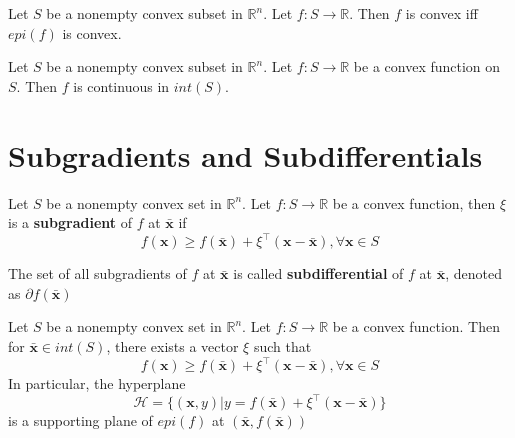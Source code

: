 			\begin{theorem}
				Let $S$ be a nonempty convex subset in $\mathbb{R}^n$. Let $f: S\rightarrow \mathbb{R}$. Then $f$ is convex iff $epi(f)$ is convex.
			\end{theorem}

			\begin{theorem}
				Let $S$ be a nonempty convex subset in $\mathbb{R}^n$. Let $f: S\rightarrow \mathbb{R}$ be a convex function on $S$. Then $f$ is continuous in $int(S)$.
			\end{theorem}

		\section{Subgradients and Subdifferentials}
			\begin{definition}[Subgradient]
				Let $S$ be a nonempty convex set in $\mathbb{R}^n$. Let $f: S\rightarrow \mathbb{R}$ be a convex function, then $\xi$ is a \textbf{subgradient} of $f$ at $\bar{\mathbf{x}}$ if
				\begin{equation}
					f(\mathbf{x}) \ge f(\bar{\mathbf{x}}) + \xi^\top(\mathbf{x} - \bar{\mathbf{x}}), \forall \mathbf{x} \in S
				\end{equation}
			\end{definition}

			\begin{definition}[Subdifferential]
				The set of all subgradients of $f$ at $\bar{\mathbf{x}}$ is called \textbf{subdifferential} of $f$ at $\bar{\mathbf{x}}$, denoted as $\partial f(\bar{\mathbf{x}})$
			\end{definition}

			\begin{theorem}
				Let $S$ be a nonempty convex set in $\mathbb{R}^n$. Let $f: S\rightarrow \mathbb{R}$ be a convex function. Then for $\bar{\mathbf{x}} \in int(S)$, there exists a vector $\xi$ such that
				\begin{equation}
					f(\mathbf{x}) \ge f(\bar{\mathbf{x}}) + \xi^\top(\mathbf{x} - \bar{\mathbf{x}}), \forall \mathbf{x} \in S
				\end{equation}
				In particular, the hyperplane
				\begin{equation}
					\mathcal{H} = \{(\mathbf{x}, y)|y = f(\bar{\mathbf{x}}) + \xi^\top(\mathbf{x} - \bar{\mathbf{x}})\}
				\end{equation}
				is a supporting plane of $epi(f)$ at $(\bar{\mathbf{x}}, f(\bar{\mathbf{x}}))$
			\end{theorem}

